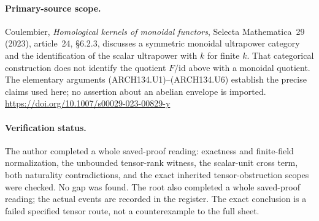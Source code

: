\paragraph{Primary-source scope.}
Coulembier, \emph{Homological kernels of monoidal functors},
Selecta Mathematica~29 (2023), article~24,
\S6.2.3, discusses a symmetric monoidal ultrapower category and
the identification of the scalar ultrapower with $k$ for finite
$k$.  That categorical construction does not identify the
quotient $F/\mathrm{id}$ above with a monoidal quotient.
The elementary arguments (ARCH134.U1)--(ARCH134.U6) establish
the precise claims used here; no assertion about an abelian
envelope is imported.
\url{https://doi.org/10.1007/s00029-023-00829-y}

\paragraph{Verification status.}
The author completed a whole saved-proof reading: exactness and
finite-field normalization, the unbounded tensor-rank witness, the
scalar-unit cross term, both naturality contradictions, and the
exact inherited tensor-obstruction scopes were checked.  No gap
was found. The root also completed a whole saved-proof reading;
the actual events are recorded in the register.  The
exact conclusion is a failed specified tensor route, not a
counterexample to the full sheet.
